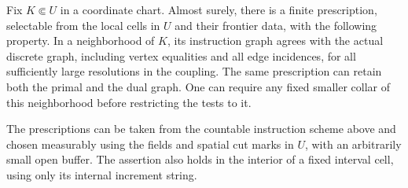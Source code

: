 \begin{samepage}
\begin{lemma}\label{inp:complete-core}
Fix $K\Subset U$ in a coordinate chart.  Almost surely, there is a
finite prescription, selectable from the local cells in $U$ and their
frontier data, with the following property.  In a neighborhood of $K$,
its instruction graph agrees with the actual discrete graph, including
vertex equalities and all edge incidences, for all sufficiently large
resolutions in the coupling.  The same prescription can retain both
the primal and the dual graph.  One can require any fixed smaller
collar of this neighborhood before restricting the tests to it.

The prescriptions can be taken from the countable instruction scheme
above and chosen measurably using the fields and spatial cut marks
in $U$, with an arbitrarily small open buffer.  The assertion also
holds in the interior of a fixed interval cell, using only its
internal increment string.
\end{lemma}
\end{samepage}

